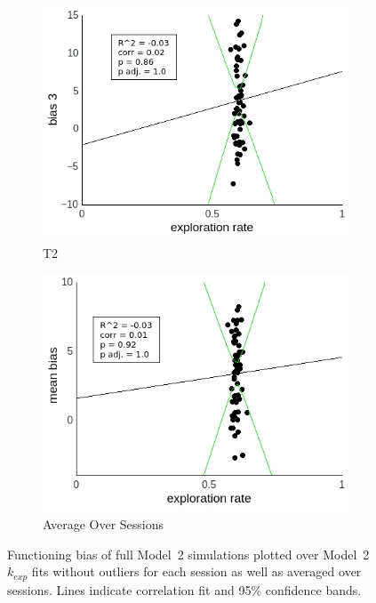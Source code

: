 \documentclass[a4paper]{scrreprt}
\begin{document}
\begin{figure}
\begin{subfigure}[b]{0.49\textwidth}
        \includegraphics[width=\textwidth]{figs/sec3/temp/tempno_diff_3_mod2mod2.jpeg}
        \caption{T2}
    \end{subfigure}
    \begin{subfigure}[b]{0.49\textwidth}
        \includegraphics[width=\textwidth]{figs/sec3/temp/tempno_diff_mean_mod2mod2.jpeg}
        \caption{Average Over Sessions}
    \end{subfigure}
\caption{Functioning bias of full Model~2 simulations plotted over Model~2 $k_{exp}$ fits without outliers for each session as well as averaged over sessions. Lines indicate correlation fit and 95\% confidence bands.}
\label{fig:tempno_diff_mod2mod2}
\end{figure}
\end{document}
